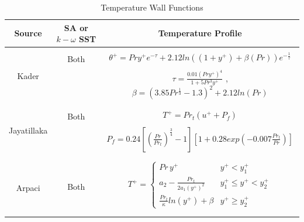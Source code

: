 \begin{table}[htb!]
\centering
\caption{Temperature Wall Functions}
\label{tab:temperatureprofiles}
\begin{tabular}{ccc}
\hline
Source &
SA or $k-\omega$ SST &
Temperature Profile\\ \hline\hline
\\
\multirow{3}{*}{Kader \cite{kader1972heat}} & \multirow{2}{*}{Both} & $\theta^+ = Pry^+ e^{-\tau} + 2.12 ln((1+y^+) + \beta(Pr)) e^{-\frac{1}{\tau}}$ \\ \\ & & $\tau = \frac{0.01 (Pry^+)^4}{1+5Pr^3y^+}$ , $\beta = (3.85 Pr^{\frac{1}{3}}-1.3)^2+ 2.12ln(Pr)$ \\ \\ 

\\

\multirow{3}{*}{Jayatillaka \cite{jayatilleke1966influence}} & \multirow{2}{*}{Both} & $T^+ = Pr_t(u^+ + P_f)$ \\ \\ & & $P_f = 0.24 [(\frac{Pr}{Pr_t})^\frac{3}{4}-1][1+0.28 exp(-0.007 \frac{Pr_t}{Pr})]$ \\ \\ 

\\


\multirow{3}{*}{Arpaci  \cite{arpaci1984heat}} & \multirow{2}{*}{Both} & $  T^+ =
    \begin{cases}
      Pr \, y^+ & y^+ < y^+_1\\
    a_2 - \frac{Pr_t}{2a_1(y^+)^2} & y^+_1 \leq y^+ < y^+_2  \\
    \frac{Pr_t}{\kappa} ln(y^+) + \beta &  y^+ \geq y^+_2 
    \end{cases} $ \\  \\ \\ 
\hline
\end{tabular}
\end{table}

